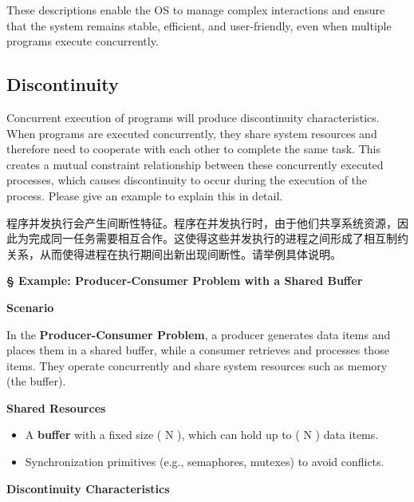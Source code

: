 \documentclass[a4paper]{book}
\newcommand{\sfbf}[1]{{\normalsize\textsf{\textbf{§ #1}}}}
\begin{document}
These descriptions enable the OS to manage complex interactions and ensure that the system remains stable, efficient, and user-friendly, even when multiple programs execute concurrently.


\subsection{Discontinuity}

\begin{greenbox}
Concurrent execution of programs will produce discontinuity characteristics. When programs are executed concurrently, they share system resources and therefore need to cooperate with each other to complete the same task. This creates a mutual constraint relationship between these concurrently executed processes, which causes discontinuity to occur during the execution of the process. Please give an example to explain this in detail.
\end{greenbox}

程序并发执行会产生间断性特征。程序在并发执行时，由于他们共享系统资源，因此为完成同一任务需要相互合作。这使得这些并发执行的进程之间形成了相互制约关系，从而使得进程在执行期间出新出现间断性。请举例具体说明。 

\sfbf{Example: Producer-Consumer Problem with a Shared Buffer}

\textbf{Scenario}

In the \textbf{Producer-Consumer Problem}, a producer generates data items and places them in a shared buffer, while a consumer retrieves and processes those items. They operate concurrently and share system resources such as memory (the buffer).

\textbf{Shared Resources}

\begin{itemize}
\item 
A \textbf{buffer} with a fixed size ( N ), which can hold up to ( N ) data items.

\item 
Synchronization primitives (e.g., semaphores, mutexes) to avoid conflicts.

\end{itemize}

\textbf{Discontinuity Characteristics}
\end{document}
